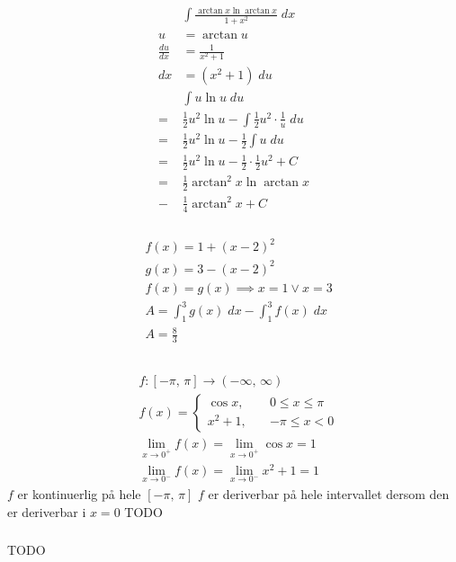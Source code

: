 \documentclass[defaultpackages]{cheatsheet}
\begin{document}
	\subsubsection{}
	\begin{align*}
	&\int \frac{\arctan x \ln \arctan x}{1+x^2} \;dx\\
	u &= \arctan u\\
	\frac{du}{dx}&= \frac{1}{x^2+1}\\
	dx &= (x^2+1)\;du\\
	&\int u \ln u \; du\\
	=& \frac{1}{2} u^2 \ln u - \int \frac{1}{2}u^2 \cdot \frac{1}{u}\;du\\
	=& \frac{1}{2} u^2 \ln u - \frac{1}{2} \int u\;du\\
	=& \frac{1}{2} u^2 \ln u - \frac{1}{2} \cdot \frac{1}{2} u^2 + C \\
	=& \frac{1}{2} \arctan^2 x \ln \arctan x \\-& \frac{1}{4} \arctan^2x + C
	\end{align*}
	\subsubsection{}
	\begin{align*}
		&f(x) = 1 + (x-2)^2\\
		&g(x) = 3 - (x-2)^2\\
		&f(x)=g(x)\implies x=1 \vee x=3\\
		&A = \int_1^3 g(x) \;dx - \int_1^3 f(x) \;dx\\
		&A = \frac{8}{3}
	\end{align*}
	\subsection{}
	\begin{align*}
		&f : [-\pi,\,\pi] \to (-\infty,\,\infty)\\
		&f(x) = \begin{cases}
		\cos x,\quad &0\le x\le \pi\\
		x^2+1,\quad &-\pi \le x < 0
		\end{cases}\\
		&\lim_{x\to 0^+} f(x) = \lim_{x\to 0^+}\cos x = 1\\
		&\lim_{x\to 0^-} f(x) = \lim_{x\to 0^-}x^2+1 = 1
	\end{align*}
	$f$ er kontinuerlig på hele $[-\pi,\,\pi]$
	$f$ er deriverbar på hele intervallet dersom den er deriverbar i $x=0$
	TODO
	\subsubsection{}
	TODO
\end{document}
